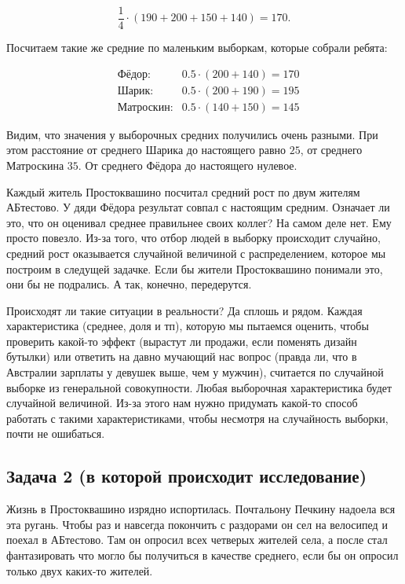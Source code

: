 \documentclass[12pt, a4paper, oneside]{article}
\begin{document}
\[
\frac{1}{4} \cdot (190 + 200 + 150 + 140) = 170.
\]

Посчитаем такие же средние по маленьким выборкам, которые собрали ребята: 

\begin{equation*} 
\begin{aligned} 
& \text{Фёдор:}  & 0.5 \cdot (200 + 140) = 170 \\
& \text{Шарик:}  & 0.5 \cdot (200 + 190) = 195 \\
& \text{Матроскин:} & 0.5 \cdot (140 + 150) = 145 
\end{aligned}
\end{equation*}

Видим, что значения у выборочных средних получились очень разными. При этом расстояние от среднего Шарика до настоящего равно $25$, от среднего Матроскина $35$. От среднего Фёдора до настоящего нулевое. 

Каждый житель Простоквашино посчитал средний рост по двум жителям АБтестово. У дяди Фёдора результат совпал с настоящим средним. Означает ли это, что он оценивал среднее правильнее своих коллег?  На самом деле нет. Ему просто повезло.  Из-за того, что отбор людей в выборку происходит случайно, средний рост оказывается случайной величиной с распределением, которое мы построим в следущей задачке. Если бы жители Простоквашино понимали это, они бы не подрались. А так, конечно, передерутся. 

Происходят ли такие ситуации в реальности? Да сплошь и рядом. Каждая характеристика (среднее, доля и тп), которую мы пытаемся оценить, чтобы проверить какой-то эффект (вырастут ли продажи, если поменять дизайн бутылки) или ответить на давно мучающий нас вопрос (правда ли, что в Австралии зарплаты у девушек выше, чем у мужчин), считается по случайной выборке из генеральной совокупности. Любая выборочная характеристика будет случайной величиной. Из-за этого нам нужно придумать какой-то способ работать с такими характеристиками, чтобы несмотря на случайность выборки, почти не ошибаться. 


\subsection*{Задача 2 (в которой происходит исследование)}

Жизнь в Простоквашино изрядно испортилась. Почтальону Печкину надоела вся эта ругань. Чтобы раз и навсегда покончить с раздорами он сел на велосипед и поехал в АБтестово. Там он опросил всех четверых жителей села, а после стал фантазировать что могло бы получиться в качестве среднего, если бы он опросил только двух каких-то жителей. 
\end{document}

